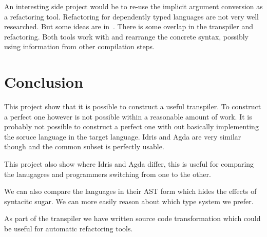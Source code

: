 An interesting side project would be to re-use the implicit argument conversion
as a refactoring tool. Refactoring for dependently typed languages are not very
well researched. But some ideas are in~\cite{wibergh2019}. There is some
overlap in the transpiler and refactoring. Both tools work with and rearrange
the concrete syntax, possibly using information from other compilation steps.


\section{Conclusion}

This project show that it is possible to construct
a useful transpiler. To construct a perfect one however is not possible within
a reasonable amount of work. It is probably not possible to construct a perfect
one with out basically implementing the soruce language in the target language.
Idris and Agda are very similar though and the common subset is perfectly
usable.

This project also show where Idris and Agda differ, this is useful for
comparing the lanugagres and programmers switching from one to the other.

We can also compare the languages in their AST form which hides the effects of
syntacitc sugar. We can more easily reason about which type system we prefer.

As part of the transpiler we have written source code transformation which
could be useful for automatic refactoring tools.



